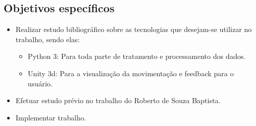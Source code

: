 \subsection{Objetivos específicos}                                              
\label{Sub:ObjetivosEspecificos}
\begin{itemize}                                                                 

\item Realizar estudo bibliográfico sobre as tecnologias que desejam-se 
utilizar no trabalho, sendo elas:
  \begin{itemize}
  \item Python 3: Para toda parte de tratamento e processamento dos dados.
  \item Unity 3d: Para a visualização da movimentação e feedback para o usuário.
  \end{itemize}                                                                     

\item Efetuar estudo prévio no trabalho do Roberto de Souza Baptista.

\item Implementar trabalho.

\end{itemize} 

